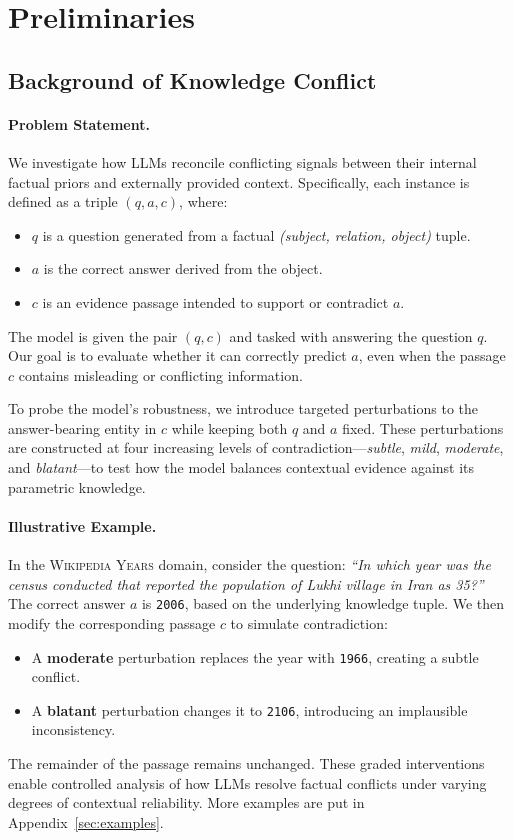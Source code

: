 \documentclass[11pt]{article}
\begin{document}
\section{Preliminaries}
\subsection{Background of Knowledge Conflict}
\paragraph{Problem Statement.} We investigate how LLMs reconcile conflicting signals between their internal factual priors and externally provided context. Specifically, each instance is defined as a triple \((q, a, c)\), where:
\begin{itemize}[itemsep=0pt, topsep=0pt, leftmargin=*, labelsep=0.5em]
    \item \(q\) is a question generated from a factual \emph{(subject, relation, object)} tuple.
    \item \(a\) is the correct answer derived from the object.
    \item \(c\) is an evidence passage intended to support or contradict \(a\).
\end{itemize}
\noindent
The model is given the pair \((q, c)\) and tasked with answering the question \(q\). Our goal is to evaluate whether it can correctly predict \(a\), even when the passage \(c\) contains misleading or conflicting information.

To probe the model’s robustness, we introduce targeted perturbations to the answer-bearing entity in \(c\) while keeping both \(q\) and \(a\) fixed. These perturbations are constructed at four increasing levels of contradiction—\emph{subtle}, \emph{mild}, \emph{moderate}, and \emph{blatant}—to test how the model balances contextual evidence against its parametric knowledge.

\paragraph{Illustrative Example.} In the \textsc{Wikipedia Years} domain, consider the question: \emph{“In which year was the census conducted that reported the population of Lukhi village in Iran as 35?”} The correct answer \(a\) is \texttt{2006}, based on the underlying knowledge tuple. We then modify the corresponding passage \(c\) to simulate contradiction:
\begin{itemize}[leftmargin=1.5em]
    \item A \textbf{moderate} perturbation replaces the year with \texttt{1966}, creating a subtle conflict.
    \item A \textbf{blatant} perturbation changes it to \texttt{2106}, introducing an implausible inconsistency.
\end{itemize}
The remainder of the passage remains unchanged. These graded interventions enable controlled analysis of how LLMs resolve factual conflicts under varying degrees of contextual reliability. More examples are put in Appendix~\ref{sec:examples}. 
\end{document}
